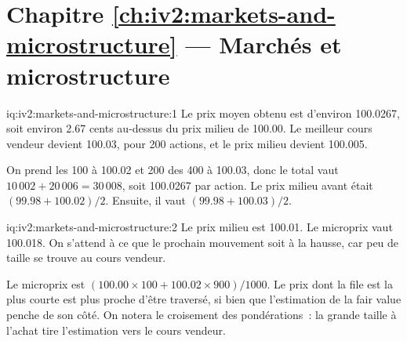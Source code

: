 \section*{Chapitre \ref{ch:iv2:markets-and-microstructure} --- Marchés et microstructure}

\begin{solution}{iq:iv2:markets-and-microstructure:1}
Le prix moyen obtenu est d'environ 100.0267, soit environ 2.67 cents au-dessus du prix milieu de 100.00. Le meilleur cours vendeur devient 100.03, pour 200 actions, et le prix milieu devient 100.005.

On prend les 100 à 100.02 et 200 des 400 à 100.03, donc le total vaut $10\,002 + 20\,006 = 30\,008$, soit 100.0267 par action. Le prix milieu avant était $(99.98 + 100.02)/2$. Ensuite, il vaut $(99.98 + 100.03)/2$.

\end{solution}

\begin{solution}{iq:iv2:markets-and-microstructure:2}
Le prix milieu est 100.01. Le microprix vaut 100.018. On s'attend à ce que le prochain mouvement soit à la hausse, car peu de taille se trouve au cours vendeur.

Le microprix est $(100.00 \times 100 + 100.02 \times 900)/1000$. Le prix dont la file est la plus courte est plus proche d'être traversé, si bien que l'estimation de la fair value penche de son côté. On notera le croisement des pondérations~: la grande taille à l'achat tire l'estimation vers le cours vendeur.

\end{solution}

